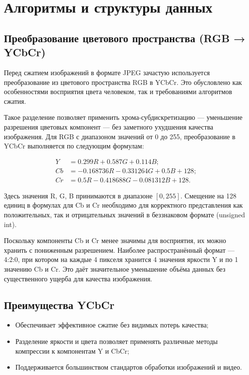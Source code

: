 \section{Алгоритмы и структуры данных}
\subsection{Преобразование цветового пространства (RGB → YCbCr)}

Перед сжатием изображений в формате JPEG зачастую используется преобразование из цветового пространства RGB в YCbCr. 
Это обусловлено как особенностями восприятия цвета человеком, так и требованиями алгоритмов сжатия.


Такое разделение позволяет применить хрома-субдискретизацию — уменьшение разрешения цветовых компонент — без заметного ухудшения качества изображения.
Для RGB с диапазоном значений от 0 до 255, преобразование в YCbCr выполняется по следующим формулам:


\begin{equation}
    \begin{aligned}
        Y &= 0.299R + 0.587G + 0.114B; \\
        Cb &= -0.168736R - 0.331264G + 0.5B + 128; \\
        Cr &= 0.5R - 0.418688G - 0.081312B + 128.
    \end{aligned}
\end{equation}


Здесь значения R, G, B принимаются в диапазоне $[0, 255]$. 
Смещение на 128 единиц в формулах для Cb и Cr необходимо для корректного представления как положительных, так и отрицательных значений в беззнаковом формате (unsigned int).

Поскольку компоненты Cb и Cr менее значимы для восприятия, их можно хранить с пониженным разрешением. 
Наиболее распространённый формат — 4:2:0, при котором на каждые 4 пикселя хранится 4 значения яркости Y и по 1 значению Cb и Cr. 
Это даёт значительное уменьшение объёма данных без существенного ущерба для качества изображения.



\subsection{Преимущества YCbCr}
    \begin{itemize}
        \item Обеспечивает эффективное сжатие без видимых потерь качества;
        \item Разделение яркости и цвета позволяет применять различные методы компрессии к компонентам Y и CbCr;
        \item Поддерживается большинством стандартов обработки изображений и видео.
    \end{itemize}

